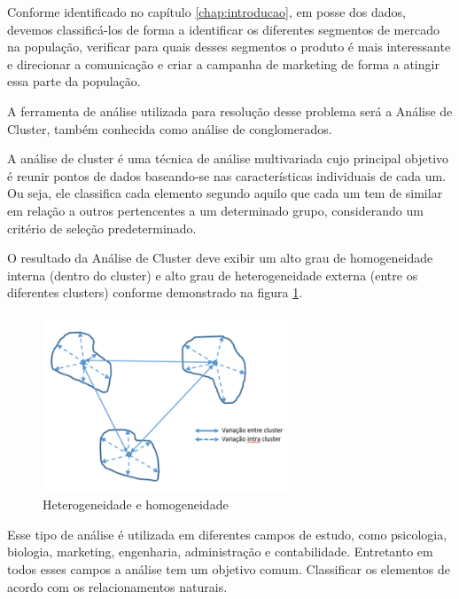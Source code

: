 \label{chap:analise}
Conforme identificado no capítulo \ref{chap:introducao}, em posse
dos dados, devemos classificá-los de forma a identificar os diferentes
segmentos de mercado na população, verificar para quais desses segmentos
o produto é mais interessante e direcionar a comunicação e criar a
campanha de marketing de forma a atingir essa parte da população.

A ferramenta de análise utilizada para resolução desse problema será
a Análise de Cluster, também conhecida como análise de conglomerados.

A análise de cluster é uma técnica de análise multivariada cujo principal
objetivo é reunir pontos de dados baseando-se nas características
individuais de cada um. Ou seja, ele classifica cada elemento segundo
aquilo que cada um tem de similar em relação a outros pertencentes
a um determinado grupo, considerando um critério de seleção predeterminado.

O resultado da Análise de Cluster deve exibir um alto grau de homogeneidade
interna (dentro do cluster) e alto grau de heterogeneidade externa
(entre os diferentes clusters) conforme demonstrado na figura \ref{fig:clustering}.

\begin{figure}
\begin{centering}
\includegraphics[width=0.65\textwidth]{Imagens/clustering}
\par\end{centering}

\caption{\label{fig:clustering}Heterogeneidade e homogeneidade}
\end{figure}


Esse tipo de análise é utilizada em diferentes campos de estudo, como
psicologia, biologia, marketing, engenharia, administração e contabilidade.
Entretanto em todos esses campos a análise tem um objetivo comum.
Classificar os elementos de acordo com os relacionamentos naturais.

